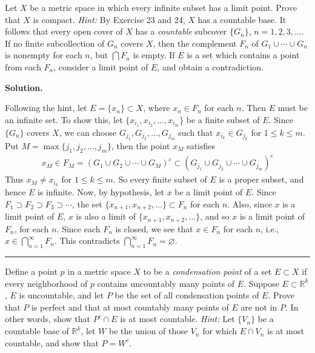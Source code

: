 \documentclass[12pt]{article}
\theoremstyle{definition}
\begin{document}
Let $X$ be a metric space in which every infinite subset has a limit point. Prove that $X$ is compact. \textit{Hint:} By Exercise 23 and 24, $X$ has a countable base. It follows that every open cover of $X$ has a \textit{countable} subcover $\{G_n\}$, $n=1,2,3,\ldots$. If no finite subcollection of $G_n$ covers $X$, then the complement $F_n$ of $G_1\cup\cdots\cup G_n$ is nonempty for each $n$, but $\bigcap F_n$ is empty. If $E$ is a set which contains a point from each $F_n$, consider a limit point of $E$, and obtain a contradiction.

\smallskip
\noindent\textbf{Solution.}\quad

Following the hint, let $E=\{x_n\}\subset X$, where $x_n\in F_n$ for each $n$. Then $E$ must be an infinite set. To show this, let $\{x_{i_1},x_{i_2},\ldots,x_{i_m}\}$ be a finite subset of $E$. Since $\{G_n\}$ covers $X$, we can choose $G_{j_1},G_{j_2},\ldots,G_{j_m}$ such that $x_{i_k}\in G_{j_k}$ for $1\le k\le m$. Put $M=\max\{j_1,j_2,\ldots,j_m\}$, then the point $x_M$ satisfies
\begin{align*}
x_M\in F_M=(G_1\cup G_2\cup\cdots\cup G_M)^c\subset(G_{j_1}\cup G_{j_2}\cup\cdots\cup G_{j_m})^c
\end{align*}
Thus $x_M\neq x_{i_k}$ for $1\le k\le m$. So every finite subset of $E$ is a proper subset, and hence $E$ is infinite. Now, by hypothesis, let $x$ be a limit point of $E$. Since $F_1\supset F_2\supset F_3\supset\cdots$, the set $\{x_{n+1},x_{n+2},\ldots\}\subset F_n$ for each $n$. Also, since $x$ is a limit point of $E$, $x$ is also a limit of $\{x_{n+1},x_{n+2},\ldots\}$, and so $x$ is a limit point of $F_n$, for each $n$. Since each $F_n$ is closed, we see that $x\in F_n$ for each $n$, i.e., $x\in\bigcap_{n=1}^\infty F_n$. This contradicts $\bigcap_{n=1}^\infty F_n=\varnothing$.



\bigskip\noindent\hrule\bigskip

Define a point $p$ in a metric space $X$ to be a \textit{condensation point} of a set $E\subset X$ if every neighborhood of $p$ contains uncountably many points of $E$.
Suppose $E\subset \mathbb{R}^k$, $E$ is uncountable, and let $P$ be the set of all condensation points of $E$. Prove that $P$ is perfect and that at most countably many points of $E$ are not in $P$. In other words, show that $P^c\cap E$ is at most countable. \textit{Hint:} Let $\{V_n\}$ be a countable base of $\mathbb{R}^k$, let $W$ be the union of those $V_n$ for which $E\cap V_n$ is at most countable, and show that $P=W^c$.
\end{document}

